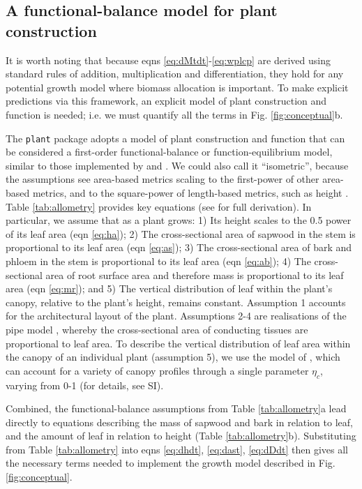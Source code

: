 \documentclass[9pt,twocolumn,twoside,lineno]{pnas-new}
\newcommand{\plant}{\texttt{plant}}
\begin{document}
\subsection{A functional-balance model for plant construction}

It is worth noting that because eqns \ref{eq:dMtdt}-\ref{eq:wplcp} are derived using standard rules of addition, multiplication and differentiation, they hold for any potential growth model where biomass allocation is important. To make explicit predictions via this framework, an explicit model of plant construction and function is needed; i.e. we must quantify all the terms in Fig. \ref{fig:conceptual}b.

The {\plant} package adopts a model of plant construction and function that can be considered a first-order functional-balance or function-equilibrium model, similar to those implemented by \citep{Makela-1997} and \citep{Moorcroft-2001}. We could also call it ``isometric'', because the assumptions see area-based metrics scaling to the first-power of other area-based metrics, and to the square-power of length-based metrics, such as height \citep{Huxley-1932}. Table \ref{tab:allometry} provides key equations (see \citep{Falster-2016} for full derivation). In particular, we assume that as a plant grows:
1) Its height scales to the 0.5 power of its leaf area (eqn \ref{eq:ha});
2) The cross-sectional area of sapwood in the stem is proportional to its leaf area (eqn \ref{eq:as});
3) The cross-sectional area of bark and phloem in the stem  is proportional to its leaf area (eqn \ref{eq:ab});
4) The cross-sectional area of root surface area and therefore mass is proportional to its leaf area (eqn \ref{eq:mr}); and
5) The vertical distribution of leaf within the plant's canopy, relative to the plant's height, remains constant.
Assumption 1 accounts for the architectural layout of the plant. Assumptions 2-4 are realisations of the pipe model \citep{Shinozaki-1964}, whereby the cross-sectional area of conducting tissues are proportional to leaf area. To describe the vertical distribution of leaf area within the canopy of an individual plant (assumption 5), we use the model of \citep{Yokozawa-1995}, which can account for a variety of canopy profiles through a single parameter $\eta_c$, varying from 0-1 (for details, see SI).

Combined, the functional-balance assumptions from Table \ref{tab:allometry}a lead directly to equations describing the mass of sapwood and bark in relation to leaf, and the amount of leaf in relation to height (Table \ref{tab:allometry}b). Substituting from Table \ref{tab:allometry} into eqns \ref{eq:dhdt}, \ref{eq:dast}, \ref{eq:dDdt} then gives all the necessary terms needed to implement the growth model described in Fig. \ref{fig:conceptual}.
\end{document}
